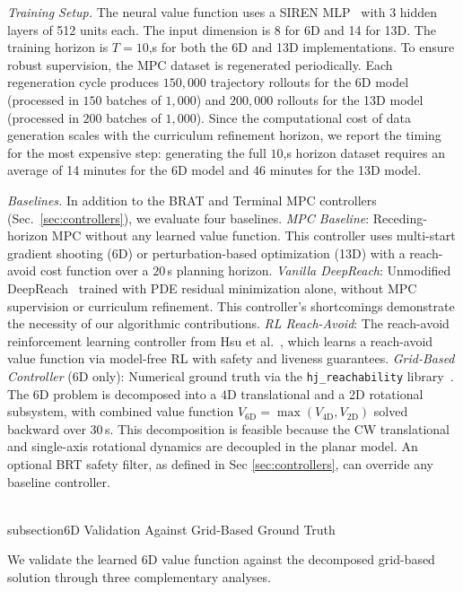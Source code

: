 \documentclass[letterpaper, 10 pt, conference]{ieeeconf}
\begin{document}
\textit{Training Setup.}
The neural value function uses a SIREN MLP~\cite{sitzmann2020siren} with 3 hidden layers of 512 units each. The input dimension is 8 for 6D and 14 for 13D. The training horizon is $T = 10$,s for both the 6D and 13D implementations. To ensure robust supervision, the MPC dataset is regenerated periodically. Each regeneration cycle produces $150{,}000$ trajectory rollouts for the 6D model (processed in $150$ batches of $1{,}000$) and $200{,}000$ rollouts for the 13D model (processed in $200$ batches of $1{,}000$). Since the computational cost of data generation scales with the curriculum refinement horizon, we report the timing for the most expensive step: generating the full $10$,s horizon dataset requires an average of 14 minutes for the 6D model and 46 minutes for the 13D model.

\textit{Baselines.}
In addition to the BRAT and Terminal MPC controllers (Sec.~\ref{sec:controllers}), we evaluate four baselines.
\emph{MPC Baseline}: Receding-horizon MPC without any learned value function. This controller uses multi-start gradient shooting (6D) or perturbation-based optimization (13D) with a reach-avoid cost function over a $20$\,s planning horizon.
\emph{Vanilla DeepReach}: Unmodified DeepReach~\cite{bansal2021deepreach} trained with PDE residual minimization alone, without MPC supervision or curriculum refinement. This controller's shortcomings demonstrate the necessity of our algorithmic contributions.
\emph{RL Reach-Avoid}: The reach-avoid reinforcement learning controller from Hsu et al.~\cite{hsu2021safety}, which learns a reach-avoid value function via model-free RL with safety and liveness guarantees.
\emph{Grid-Based Controller} (6D only): Numerical ground truth via the \texttt{hj\_reachability} library~\cite{hjreachability}. The 6D problem is decomposed into a 4D translational and a 2D rotational subsystem, with combined value function $V_{\mathrm{6D}} = \max(V_{\mathrm{4D}}, V_{\mathrm{2D}})$ solved backward over 30\,s. This decomposition is feasible because the CW translational and single-axis rotational dynamics are decoupled in the planar model.
An optional BRT safety filter, as defined in Sec \ref{sec:controllers}, can override any baseline controller.

\\subsection{6D Validation Against Grid-Based Ground Truth}

We validate the learned 6D value function against the decomposed grid-based solution through three complementary analyses.
\end{document}
